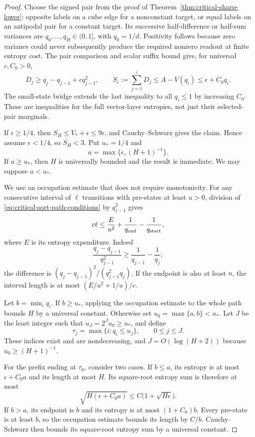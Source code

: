 \begin{proof}
Choose the signed pair from the proof of
Theorem~\ref{thm:critical-sharp-lower}: opposite labels on a cube edge
for a nonconstant target, or equal labels on an antipodal pair for a
constant target. Its successive half-difference or half-sum variances
are $q_0,\ldots,q_H\in(0,1]$, with $q_0=1/d$.
Positivity follows because zero variance could never subsequently
produce the required nonzero readout at finite entropy cost.
The pair comparison and scalar suffix bound give, for universal $c,C_0>0$,
\begin{equation}\label{eq:critical-sqrt-path-conditions}
 D_j\ge q_j-q_{j-1}+cq_{j-1}^2,
 \qquad S_i:=\sum_{j=1}^iD_j
 \le A-V(q_i)\le\epsilon+C_0q_i.
\end{equation}
The small-state bridge extends the last inequality to all $q_i\le1$
by increasing $C_0$. These are inequalities for the full vector-layer
entropies, not just their selected-pair marginals.

If $\epsilon\ge1/4$, then $S_H\le V_*+\epsilon\le9\epsilon$,
and Cauchy--Schwarz gives the claim. Hence assume $\epsilon<1/4$,
so $S_H<3$. Put $u_*=1/4$ and
\[
 a=\max\{\epsilon,(H+1)^{-1}\}.
\]
If $a\ge u_*$, then $H$ is universally bounded and the result is
immediate. We may suppose $a<u_*$.

We use an occupation estimate that does not require monotonicity.
For any consecutive interval of $\ell$ transitions with pre-states
at least $u>0$, division of
\eqref{eq:critical-sqrt-path-conditions} by $q_{j-1}^2$ gives
\begin{equation}\label{eq:critical-sqrt-occupation}
 c\ell\le \frac{E}{u^2}+\frac1{q_{\rm end}}-
                                  \frac1{q_{\rm start}},
\end{equation}
where $E$ is its entropy expenditure. Indeed
\[
 \frac{q_j-q_{j-1}}{q_{j-1}^2}
 \ge \frac1{q_{j-1}}-\frac1{q_j};
\]
the difference is $(q_j-q_{j-1})^2/(q_{j-1}^2q_j)$.
If the endpoint is also at least $u$, the interval length is at most
$(E/u^2+1/u)/c$.

Let $b=\min_iq_i$. If $b\ge u_*$, applying the occupation estimate
to the whole path bounds $H$ by a universal constant. Otherwise set
$u_0=\max\{a,b\}<u_*$. Let $J$ be the least integer such that
$u_J=2^Ju_0\ge u_*$, and define
\[
 \tau_j=\max\{i:q_i\le u_j\},\qquad 0\le j\le J.
\]
These indices exist and are nondecreasing, and
$J=O(\log(H+2))$ because $u_0\ge(H+1)^{-1}$.

For the prefix ending at $\tau_0$, consider two cases. If $b\le a$,
its entropy is at most $\epsilon+C_0a$ and its length at most $H$.
Its square-root entropy sum is therefore at most
\[
 \sqrt{H(\epsilon+C_0a)}
 \le C\bigl(1+\sqrt{H\epsilon}\bigr).
\]
If $b>a$, its endpoint is $b$ and its entropy is at most
$(1+C_0)b$. Every pre-state is at least $b$, so the occupation estimate
bounds its length by $C/b$. Cauchy--Schwarz then bounds its
square-root entropy sum by a universal constant.


\end{proof}
